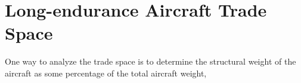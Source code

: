 \documentclass[]{aiaa-tc}%
\begin{document}
% 
%  
% 
% 

\section{Long-endurance Aircraft Trade Space}

One way to analyze the trade space is to determine the structural weight of the aircraft as some percentage of the total aircraft weight, 
\end{document}
